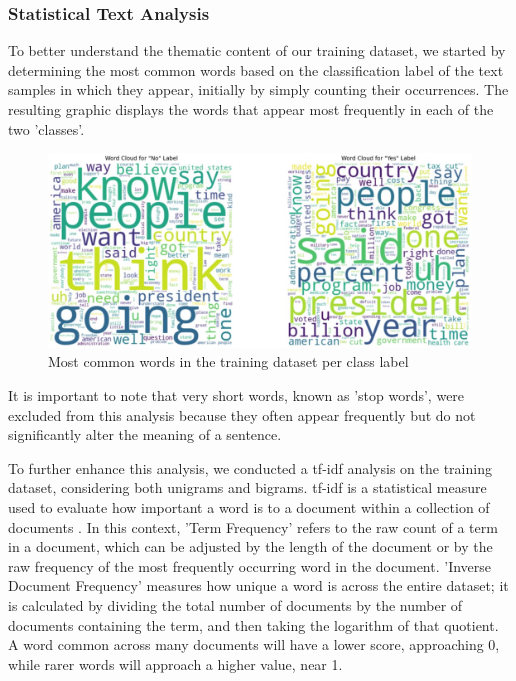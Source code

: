 \subsubsection{Statistical Text Analysis}
To better understand the thematic content of our training dataset, we started by determining the most common words based on the classification label of the text samples in which they appear, initially by simply counting their occurrences. The resulting graphic displays the words that appear most frequently in each of the two 'classes'.

\begin{figure}[h]
    \centering
    \includegraphics[width=1\textwidth]{assets/word_cloud.jpg}
    \caption{Most common words in the training dataset per class label}
    \label{fig:my_label}
\end{figure}

It is important to note that very short words, known as 'stop words', were excluded from this analysis because they often appear frequently but do not significantly alter the meaning of a sentence.

To further enhance this analysis, we conducted a \gls{tf-idf} analysis on the training dataset, considering both unigrams and bigrams. \gls{tf-idf} is a statistical measure used to evaluate how important a word is to a document within a collection of documents \cite{TF-IDF}. In this context, 'Term Frequency' refers to the raw count of a term in a document, which can be adjusted by the length of the document or by the raw frequency of the most frequently occurring word in the document. 'Inverse Document Frequency' measures how unique a word is across the entire dataset; it is calculated by dividing the total number of documents by the number of documents containing the term, and then taking the logarithm of that quotient. A word common across many documents will have a lower score, approaching 0, while rarer words will approach a higher value, near 1.

